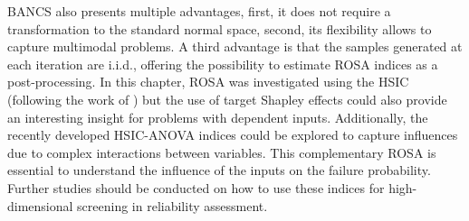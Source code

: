 BANCS also presents multiple advantages, first, it does not require a transformation to the standard normal space, second, its flexibility allows to capture multimodal problems. 
A third advantage is that the samples generated at each iteration are i.i.d., offering the possibility to estimate ROSA indices as a post-processing. 
In this chapter, ROSA was investigated using the HSIC (following the work of \citealp{marrel_chabridon_2021}) but the use of target Shapley effects \citep{ilidrissi_2021_rosa} could also provide an interesting insight for problems with dependent inputs.
Additionally, the recently developed HSIC-ANOVA indices \citep{daveiga_2021_kernel_ANOVA,sarazin_2023} could be explored to capture influences due to complex interactions between variables.
This complementary ROSA is essential to understand the influence of the inputs on the failure probability. 
Further studies should be conducted on how to use these indices for high-dimensional screening in reliability assessment.


%    
